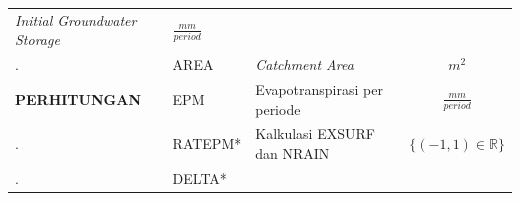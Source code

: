 \documentclass[11pt]{article}
\begin{document}
\begin{longtable}[]{@{}lllc@{}}
\begin{minipage}[t]{0.22\columnwidth}
\emph{Initial Groundwater Storage}\strut
\end{minipage} & \begin{minipage}[t]{0.22\columnwidth}\centering
\(\frac{mm}{period}\)\strut
\end{minipage}\tabularnewline
\begin{minipage}[t]{0.22\columnwidth}\raggedright
.\strut
\end{minipage} & \begin{minipage}[t]{0.22\columnwidth}\raggedright
AREA\strut
\end{minipage} & \begin{minipage}[t]{0.22\columnwidth}\raggedright
\emph{Catchment Area}\strut
\end{minipage} & \begin{minipage}[t]{0.22\columnwidth}\centering
\(m^2\)\strut
\end{minipage}\tabularnewline
\begin{minipage}[t]{0.22\columnwidth}\raggedright
\textbf{PERHITUNGAN}\strut
\end{minipage} & \begin{minipage}[t]{0.22\columnwidth}\raggedright
EPM\strut
\end{minipage} & \begin{minipage}[t]{0.22\columnwidth}\raggedright
Evapotranspirasi per periode\strut
\end{minipage} & \begin{minipage}[t]{0.22\columnwidth}\centering
\(\frac{mm}{period}\)\strut
\end{minipage}\tabularnewline
\begin{minipage}[t]{0.22\columnwidth}\raggedright
.\strut
\end{minipage} & \begin{minipage}[t]{0.22\columnwidth}\raggedright
RATEPM*\strut
\end{minipage} & \begin{minipage}[t]{0.22\columnwidth}\raggedright
Kalkulasi EXSURF dan NRAIN\strut
\end{minipage} & \begin{minipage}[t]{0.22\columnwidth}\centering
\(\{\left(-1, 1\right) \in\mathbb{R}\}\)\strut
\end{minipage}\tabularnewline
\begin{minipage}[t]{0.22\columnwidth}\raggedright
.\strut
\end{minipage} & \begin{minipage}[t]{0.22\columnwidth}\raggedright
DELTA*\strut

\end{minipage}
\end{longtable}
\end{document}
